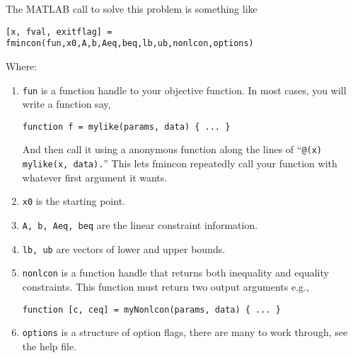 \documentclass[twoside]{article}
\begin{document}
The MATLAB call to solve this problem is something like 
\begin{center}
{\tt [x, fval, exitflag] = fmincon(fun,x0,A,b,Aeq,beq,lb,ub,nonlcon,options) }
\end{center}
Where: 
\begin{enumerate}
\item {\tt fun} is a function handle to your objective function. In most cases, you will write a function say,
\begin{center} 
{\tt function f = mylike(params, data)  \{ ... \} }
\end{center}
And then call it using a anonymous function along the lines of ``{\tt @(x) mylike(x, data).}''  This lets fmincon repeatedly call your function with whatever first argument it wants.   
\item {\tt x0} is the starting point. 
\item {\tt A, b, Aeq, beq} are the linear constraint information. 
\item {\tt lb, ub} are vectors of lower and upper bounds. 
\item {\tt nonlcon} is a function handle that returns both inequality and equality constraints. This function must return two output arguments e.g., 
\begin{center}
{\tt function [c, ceq] = myNonlcon(params, data)  \{ ... \} }
\end{center}
\item {\tt options} is a structure of option flags, there are many to work through, see the help file. 
\end{enumerate}
\end{document}
